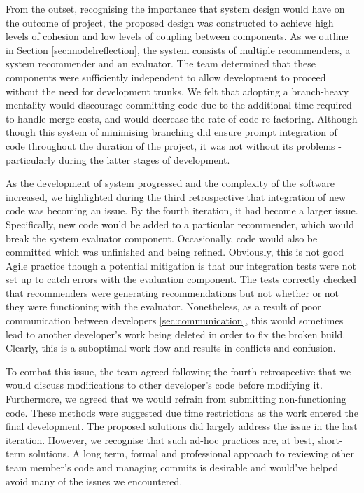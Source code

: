 \documentclass{l3proj}
\begin{document}
From the outset, recognising the importance that system design would have on the outcome of project, the proposed design was constructed to achieve high levels of cohesion and low levels of coupling between components. As we outline in Section \ref{sec:modelreflection}, the system consists of multiple recommenders, a system recommender and an evaluator. The team determined that these components were sufficiently independent to allow development to proceed without the need for development trunks. We felt that adopting a branch-heavy mentality would discourage committing code due to the additional time required to handle merge costs, and would decrease the rate of code re-factoring. Although though this system of minimising branching did ensure prompt integration of code throughout the duration of the project, it was not without its problems - particularly during the latter stages of development.

As the development of system progressed and the complexity of the software increased, we highlighted during the third retrospective that integration of new code was becoming an issue. By the fourth iteration, it had become a larger issue. Specifically, new code would be added to a particular recommender, which would break the system evaluator component. Occasionally, code would also be committed which was unfinished and being refined. Obviously, this is not good Agile practice though a potential mitigation is that our integration tests were not set up to catch errors with the evaluation component. The tests correctly checked that recommenders were generating recommendations but not whether or not they were functioning with the evaluator. Nonetheless, as a result of poor communication between developers \ref{sec:communication}, this would sometimes lead to another developer's work being deleted in order to fix the broken build. Clearly, this is a suboptimal work-flow and results in conflicts and confusion. 

To combat this issue, the team agreed following the fourth retrospective that we would discuss modifications to other developer's code before modifying it. Furthermore, we agreed that we would refrain from submitting non-functioning code. These methods were suggested due time restrictions as the work entered the final development. The proposed solutions did largely address the issue in the last iteration. However, we recognise that such ad-hoc practices are, at best, short-term solutions. A long term, formal and professional approach to reviewing other team member's code and managing commits is desirable and would've helped avoid many of the issues we encountered.
\end{document}
